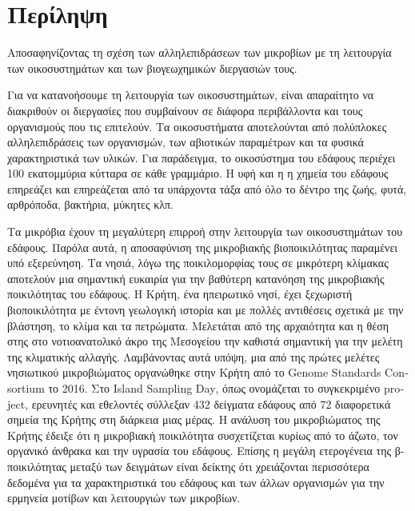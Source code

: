 \documentclass[11pt]{article}
\begin{document}
\section*{Περίληψη}
{\LARGE Αποσαφηνίζοντας τη σχέση των αλληλεπιδράσεων των μικροβίων με τη λειτουργία των οικοσυστημάτων και των βιογεωχημικών διεργασιών τους.}


\vspace{1cm}

Για να κατανοήσουμε τη λειτουργία των οικοσυστημάτων, είναι απαραίτητο να διακριθούν
οι διεργασίες που συμβαίνουν σε διάφορα περιβάλλοντα και τους οργανισμούς
που τις επιτελούν. Τα οικοσυστήματα αποτελούνται από πολύπλοκες αλληλεπιδράσεις των οργανισμών,
των αβιοτικών παραμέτρων και τα φυσικά χαρακτηριστικά των υλικών. Για παράδειγμα,
το οικοσύστημα του εδάφους περιέχει 100 εκατομμύρια κύτταρα σε κάθε γραμμάριο. Η υφή και η
η χημεία του εδάφους επηρεάζει και επηρεάζεται από τα υπάρχοντα τάξα από όλο το
δέντρο της ζωής, φυτά, αρθρόποδα, βακτήρια, μύκητες κλπ.

Τα μικρόβια έχουν τη μεγαλύτερη επιρροή στην λειτουργία των οικοσυστημάτων του εδάφους. 
Παρόλα αυτά, η αποσαφύνιση της μικροβιακής βιοποικιλότητας παραμένει υπό εξερεύνηση.
Τα νησιά, λόγω της ποικιλομορφίας τους σε μικρότερη κλίμακας αποτελούν μια σημαντική ευκαιρία για 
την βαθύτερη κατανόηση της μικροβιακής ποικιλότητας του εδάφους. 
Η Κρήτη, ένα ηπειρωτικό νησί, έχει ξεχωριστή βιοποικιλότητα με έντονη γεωλογική 
ιστορία και με πολλές αντιθέσεις σχετικά με την βλάστηση, το κλίμα και τα πετρώματα. 
Μελετάται από της αρχαιότητα και η θέση στης στο νοτιοανατολικό άκρο της Μεσογείου 
την καθιστά σημαντική για την μελέτη της κλιματικής αλλαγής.
Λαμβάνοντας αυτά υπόψη, μια από της πρώτες μελέτες νησιωτικού μικροβιώματος 
οργανώθηκε στην Κρήτη από το \textlatin{Genome Standards Consortium} το 2016. 
Στο \textlatin{Island Sampling Day}, όπως ονομάζεται το συγκεκριμένο \textlatin{project},
ερευνητές και εθελοντές σύλλεξαν 432 δείγματα εδάφους από 72 διαφορετικά σημεία της Κρήτης
στη διάρκεια μιας μέρας.
Η ανάλυση του μικροβιώματος της Κρήτης έδειξε ότι η μικροβιακή ποικιλότητα
συσχετίζεται κυρίως από το άζωτο, τον οργανικό άνθρακα και την υγρασία του εδάφους.
Επίσης η μεγάλη ετερογένεια της β-ποικιλότητας μεταξύ των δειγμάτων είναι δείκτης ότι χρειάζονται περισσότερα 
δεδομένα για τα χαρακτηριστικά του εδάφους και των άλλων οργανισμών για την ερμηνεία μοτίβων και λειτουργιών 
των μικροβίων.
\end{document}

